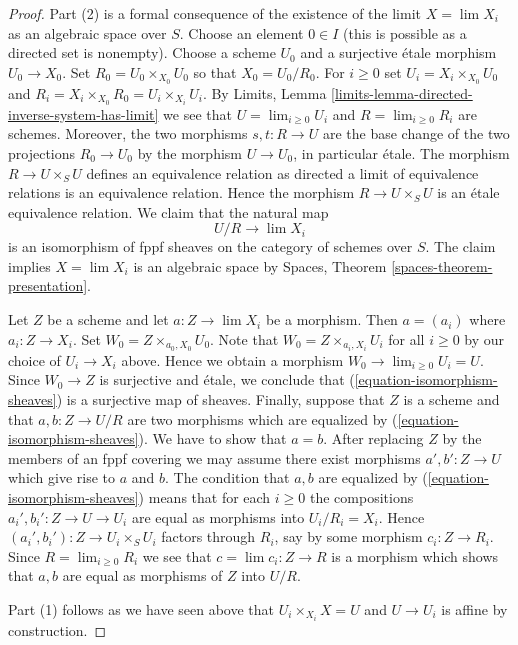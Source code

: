\documentclass{amsart}
\theoremstyle{plain}
\theoremstyle{definition}
\theoremstyle{remark}
\numberwithin{equation}{subsection}
\def\lim{\mathop{\mathrm{lim}}\nolimits}
\begin{document}
\begin{proof}
Part (2) is a formal consequence of the existence of the
limit $X = \lim X_i$ as an algebraic space over $S$.
Choose an element $0 \in I$ (this is possible as a directed set is nonempty).
Choose a scheme $U_0$ and a surjective
\'etale morphism $U_0 \to X_0$. Set $R_0 = U_0 \times_{X_0} U_0$
so that $X_0 = U_0/R_0$. For $i \geq 0$ set
$U_i = X_i \times_{X_0} U_0$ and
$R_i = X_i \times_{X_0} R_0 = U_i \times_{X_i} U_i$.
By Limits, Lemma \ref{limits-lemma-directed-inverse-system-has-limit}
we see that $U = \lim_{i \geq 0} U_i$ and $R = \lim_{i \geq 0} R_i$
are schemes. Moreover, the two morphisms $s, t : R \to U$ are the base
change of the two projections $R_0 \to U_0$ by the morphism
$U \to U_0$, in particular \'etale. The morphism $R \to U \times_S U$
defines an equivalence relation as directed a limit of equivalence relations
is an equivalence relation. Hence the morphism
$R \to U \times_S U$ is an \'etale equivalence relation. We claim that
the natural map
\begin{equation}
\label{equation-isomorphism-sheaves}
U/R \longrightarrow \lim X_i
\end{equation}
is an isomorphism of fppf sheaves on the category of schemes over $S$.
The claim implies $X = \lim X_i$ is an algebraic
space by Spaces, Theorem \ref{spaces-theorem-presentation}.

\medskip\noindent
Let $Z$ be a scheme and let $a : Z \to \lim X_i$ be a morphism.
Then $a = (a_i)$ where $a_i : Z \to X_i$. Set $W_0 = Z \times_{a_0, X_0} U_0$.
Note that $W_0 = Z \times_{a_i, X_i} U_i$ for all $i \geq 0$ by our
choice of $U_i \to X_i$ above. Hence we obtain a morphism
$W_0 \to \lim_{i \geq 0} U_i = U$. Since $W_0 \to Z$ is surjective
and \'etale, we conclude that (\ref{equation-isomorphism-sheaves})
is a surjective map of sheaves. Finally, suppose that
$Z$ is a scheme and that $a, b : Z \to U/R$ are two morphisms
which are equalized by (\ref{equation-isomorphism-sheaves}).
We have to show that $a = b$.
After replacing $Z$ by the members of an fppf covering
we may assume there exist morphisms $a', b' : Z \to U$ which
give rise to $a$ and $b$. The condition that $a, b$ are
equalized by (\ref{equation-isomorphism-sheaves}) means that
for each $i \geq 0$ the compositions $a_i', b_i' : Z \to U \to U_i$
are equal as morphisms into $U_i/R_i = X_i$. Hence
$(a_i', b_i') : Z \to U_i \times_S U_i$ factors through
$R_i$, say by some morphism $c_i : Z \to R_i$. Since
$R = \lim_{i \geq 0} R_i$ we see that $c = \lim c_i : Z \to R$
is a morphism which shows that $a, b$ are equal as morphisms
of $Z$ into $U/R$.

\medskip\noindent
Part (1) follows as we have seen above that
$U_i \times_{X_i} X = U$ and $U \to U_i$ is affine by
construction.
\end{proof}
\end{document}
